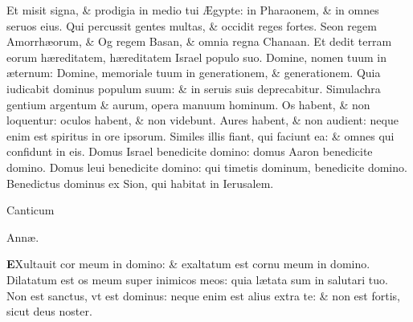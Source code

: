 \documentclass[a5paper,10pt]{book}
\def\rightmarginnote{%
	\lrmarginnote{\hskip\columnwidth \hskip -1em}}
\def\ae{æ}
\def\AE{Æ}
\begin{document}
\begin{multicols*}{2}
\newline \color{red} E\color{black}t misit signa, \& prodigia in medio tui \AE gypte: in Pharaonem, \& in omnes seruos eius.
\newline \color{red} Q\color{black}ui percussit gentes multas, \& occidit reges fortes.
\newline \color{red} S\color{black}eon regem Amorrh\ae orum, \& Og regem Basan, \& omnia regna Chanaan.
\newline \color{red} E\color{black}t dedit terram eorum h\ae reditatem, h\ae reditatem Israel populo suo.
\newline \color{red} D\color{black}omine, nomen tuum in \ae ternum: Domine, memoriale tuum in generationem, \& generationem.
\newline \color{red} Q\color{black}uia iudicabit dominus populum suum: \& in seruis suis deprecabitur.
\newline \color{red} S\color{black}imulachra gentium argentum \& aurum, opera manuum hominum.
\newline \color{red} O\color{black}s habent, \& non loquentur: oculos habent, \& non videbunt.
\newline \color{red} A\color{black}ures habent, \& non audient: neque enim est spiritus in ore ipsorum.
\newline \color{red} S\color{black}imiles illis fiant, qui faciunt ea: \& omnes qui confidunt in eis.
\newline \color{red} D\color{black}omus Israel benedicite domino: domus Aaron benedicite domino.
\newline \color{red} D\color{black}omus leui benedicite domino: qui timetis dominum, benedicite domino.
\newline \color{red} B\color{black}enedictus dominus ex Sion, qui habitat in Ierusalem.
\vspace{-1em}
\begin{center} \color{red}
\hypertarget{Anna}{Canticum} Ann\ae .
\end{center}
\vspace{-1em}
\lettrine[lines=2]{\bfseries \color{red} E}{}Xultauit\rightmarginnote{j. reg.\\2.} cor meum in domino: \& exaltatum est cornu meum in domino.%
\newline \color{red} D\color{black}ilatatum est os meum super inimicos meos: quia l\ae tata sum in salutari tuo.
\newline \color{red} N\color{black}on est sanctus, vt est dominus: neque enim est alius extra te: \& non est fortis, sicut deus noster.

\end{multicols*}
\end{document}
